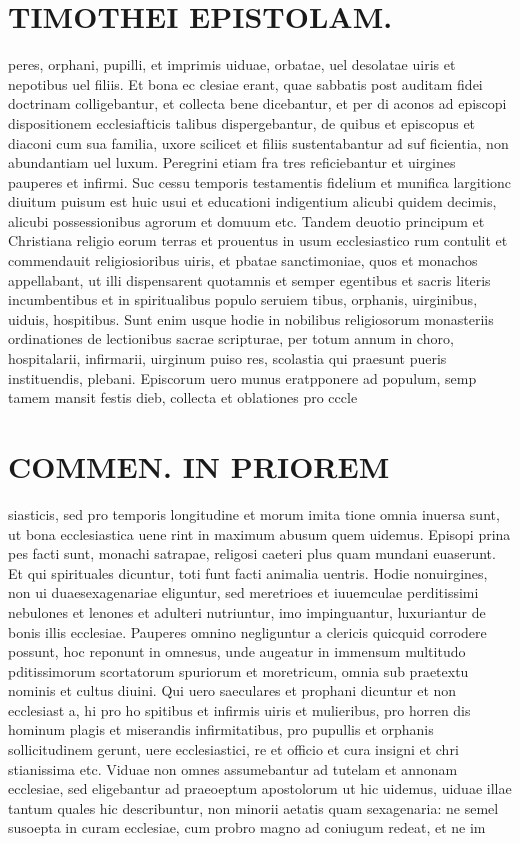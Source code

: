 \documentclass{article}
\begin{document}
\begin{pages}
\section*{TIMOTHEI EPISTOLAM. }
\marginpar{[ p.123 ]}\pstart peres, orphani, pupilli, et imprimis uiduae, orbatae, uel desolatae uiris et nepotibus uel filiis. Et bona ec clesiae erant, quae sabbatis post auditam fidei doctrinam colligebantur, et collecta bene dicebantur, et per di aconos ad episcopi dispositionem ecclesiafticis talibus dispergebantur, de quibus et episcopus et diaconi cum sua familia, uxore scilicet et filiis sustentabantur ad suf ficientia, non abundantiam uel luxum. Peregrini etiam fra tres reficiebantur et uirgines pauperes et infirmi. Suc cessu temporis testamentis fidelium et munifica largitionc diuitum puisum est huic usui et educationi indigentium alicubi quidem decimis, alicubi possessionibus agrorum et domuum etc. Tandem deuotio principum et Christiana religio eorum terras et prouentus in usum ecclesiastico rum contulit et commendauit religiosioribus uiris, et pbatae sanctimoniae, quos et monachos appellabant, ut illi dispensarent quotamnis et semper egentibus et sacris literis incumbentibus et in spiritualibus populo seruiem tibus, orphanis, uirginibus, uiduis, hospitibus. Sunt enim usque hodie in nobilibus religiosorum monasteriis ordinationes de lectionibus sacrae scripturae, per totum annum in choro, hospitalarii, infirmarii, uirginum puiso res, scolastia qui praesunt pueris instituendis, plebani. Episcorum uero munus eratpponere ad populum, semp tamem mansit festis dieb, collecta et oblationes pro cccle  \pend
\section*{COMMEN. IN PRIOREM }
\marginpar{[ p.124 ]}\pstart siasticis, sed pro temporis longitudine et morum imita tione omnia inuersa sunt, ut bona ecclesiastica uene rint in maximum abusum quem uidemus. Episopi prina pes facti sunt, monachi satrapae, religosi caeteri plus quam mundani euaserunt. Et qui spirituales dicuntur, toti funt facti animalia uentris. Hodie nonuirgines, non ui duaesexagenariae eliguntur, sed meretrioes et iuuemculae perditissimi nebulones et lenones et adulteri nutriuntur, imo impinguantur, luxuriantur de bonis illis ecclesiae. Pauperes omnino negliguntur a clericis quicquid corrodere possunt, hoc reponunt in omnesus, unde augeatur in immensum multitudo pditissimorum scortatorum spuriorum et moretricum, omnia sub praetextu nominis et cultus diuini. Qui uero saeculares et prophani dicuntur et non ecclesiast a, hi pro ho spitibus et infirmis uiris et mulieribus, pro horren dis hominum plagis et miserandis infirmitatibus, pro pupullis et orphanis sollicitudinem gerunt, uere ecclesiastici, re et officio et cura insigni et chri stianissima etc. Viduae non omnes assumebantur ad tutelam et annonam ecclesiae, sed eligebantur ad praeoeptum apostolorum ut hic uidemus, uiduae illae tantum quales hic describuntur, non minorii aetatis quam sexagenaria: ne semel susoepta in curam ecclesiae, cum probro magno ad coniugum redeat, et ne im  \pend

\end{pages}
\end{document}
